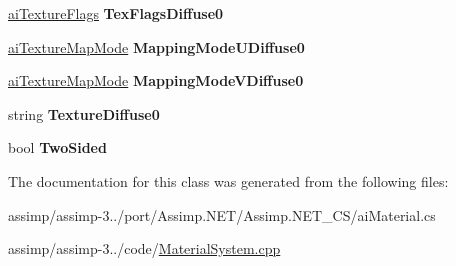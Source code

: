\begin{DoxyCompactItemize}
\item 
\hypertarget{classai_material_a44b5833c6f891ab18e75718f6dc6790a}{\hyperlink{material_8h_a6d003e078617e4e80d1313a6250b2dfd}{ai\+Texture\+Flags} {\bfseries Tex\+Flags\+Diffuse0}}\label{classai_material_a44b5833c6f891ab18e75718f6dc6790a}

\item 
\hypertarget{classai_material_a83eaff7cbccbc712a6da465e38243eb7}{\hyperlink{material_8h_a6cbe56056751aa80e8dd714632a49de0}{ai\+Texture\+Map\+Mode} {\bfseries Mapping\+Mode\+U\+Diffuse0}}\label{classai_material_a83eaff7cbccbc712a6da465e38243eb7}

\item 
\hypertarget{classai_material_a1683232c344698e67212faff98151791}{\hyperlink{material_8h_a6cbe56056751aa80e8dd714632a49de0}{ai\+Texture\+Map\+Mode} {\bfseries Mapping\+Mode\+V\+Diffuse0}}\label{classai_material_a1683232c344698e67212faff98151791}

\item 
\hypertarget{classai_material_a00157a24f399a2b896793384b26c7c39}{string {\bfseries Texture\+Diffuse0}}\label{classai_material_a00157a24f399a2b896793384b26c7c39}

\item 
\hypertarget{classai_material_a40f556188cffe8417dc44a3f4b69feb1}{bool {\bfseries Two\+Sided}}\label{classai_material_a40f556188cffe8417dc44a3f4b69feb1}

\end{DoxyCompactItemize}


The documentation for this class was generated from the following files\+:\begin{DoxyCompactItemize}
\item 
assimp/assimp-\/3../port/\+Assimp.\+N\+E\+T/\+Assimp.\+N\+E\+T\+\_\+\+C\+S/ai\+Material.\+cs\item 
assimp/assimp-\/3../code/\hyperlink{_material_system_8cpp}{Material\+System.\+cpp}\end{DoxyCompactItemize}
